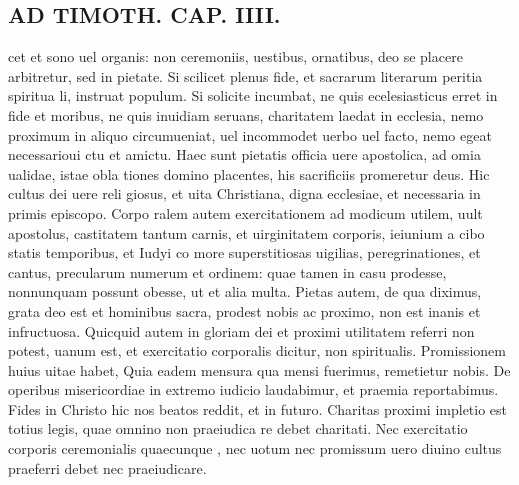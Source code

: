 \documentclass{article}
\begin{document}
\begin{pages}
\section*{AD TIMOTH. CAP. IIII. }
\marginpar{[ p.509 ]}\pstart cet et sono uel organis: non ceremoniis, uestibus, ornatibus, deo se placere arbitretur, sed in pietate. Si scilicet plenus fide, et sacrarum literarum peritia spiritua li, instruat populum. Si solicite incumbat, ne quis ecelesiasticus erret in fide et moribus, ne quis inuidiam seruans, charitatem laedat in ecclesia, nemo proximum in aliquo circumueniat, uel incommodet uerbo uel facto, nemo egeat necessarioui ctu et amictu. Haec sunt pietatis officia uere apostolica, ad omia ualidae, istae obla tiones domino placentes, his sacrificiis promeretur deus. Hic cultus dei uere reli giosus, et uita Christiana, digna ecclesiae, et necessaria in primis episcopo. Corpo ralem autem exercitationem ad modicum utilem, uult apostolus, castitatem tantum carnis, et uirginitatem corporis, ieiunium a cibo statis temporibus, et Iudyi co more superstitiosas uigilias, peregrinationes, et cantus, precularum numerum et ordinem: quae tamen in casu prodesse, nonnunquam possunt obesse, ut et alia multa. Pietas autem, de qua diximus, grata deo est et hominibus sacra, prodest nobis ac proximo, non est inanis et infructuosa. Quicquid autem in gloriam dei et proximi utilitatem referri non potest, uanum est, et exercitatio corporalis dicitur, non spiritualis. Promissionem huius uitae habet, Quia eadem mensura qua mensi fuerimus, remetietur nobis. De operibus misericordiae in extremo iudicio laudabimur, et praemia reportabimus. Fides in Christo hic nos beatos reddit, et in futuro. Charitas proximi impletio est totius legis, quae omnino non praeiudica re debet charitati. Nec exercitatio corporis ceremonialis quaecunque , nec uotum nec promissum uero diuino cultus praeferri debet nec praeiudicare.  \pend
{}
{}

\end{pages}
\end{document}
